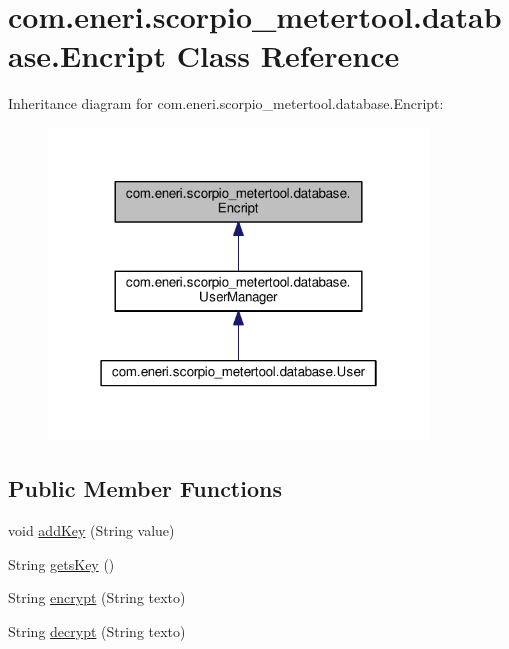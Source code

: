 \hypertarget{classcom_1_1eneri_1_1scorpio__metertool_1_1database_1_1_encript}{}\section{com.\+eneri.\+scorpio\+\_\+metertool.\+database.\+Encript Class Reference}
\label{classcom_1_1eneri_1_1scorpio__metertool_1_1database_1_1_encript}


Inheritance diagram for com.\+eneri.\+scorpio\+\_\+metertool.\+database.\+Encript\+:
\nopagebreak
\begin{figure}[H]
\begin{center}
\leavevmode
\includegraphics[width=286pt]{classcom_1_1eneri_1_1scorpio__metertool_1_1database_1_1_encript__inherit__graph}
\end{center}
\end{figure}
\subsection*{Public Member Functions}
\begin{DoxyCompactItemize}
\item 
void \hyperlink{classcom_1_1eneri_1_1scorpio__metertool_1_1database_1_1_encript_afa3b3b29ebdf0c78ccc8af19b0949795}{add\+Key} (String value)
\item 
String \hyperlink{classcom_1_1eneri_1_1scorpio__metertool_1_1database_1_1_encript_a8f36273750f31dedadeb1d9b4d07421e}{gets\+Key} ()
\item 
String \hyperlink{classcom_1_1eneri_1_1scorpio__metertool_1_1database_1_1_encript_aefec35239c66a29fc4770581919bb2ef}{encrypt} (String texto)
\item 
String \hyperlink{classcom_1_1eneri_1_1scorpio__metertool_1_1database_1_1_encript_a521328aea342b5a7d52b921d5e1e6c6d}{decrypt} (String texto)
\end{DoxyCompactItemize}


